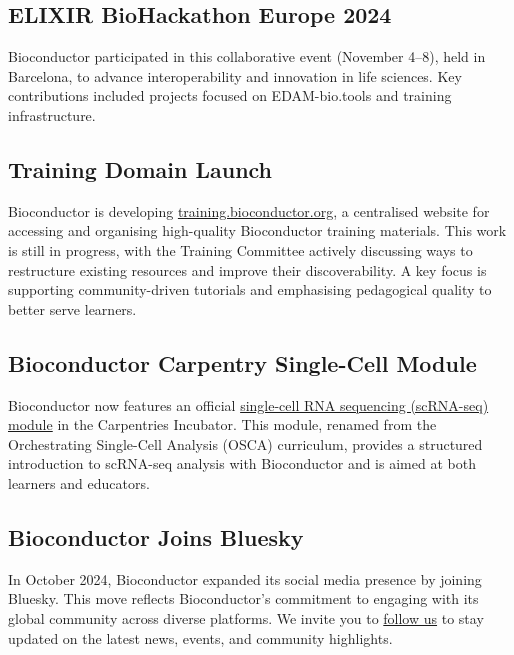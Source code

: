 \hypertarget{elixir-biohackathon-europe-2024}{%
\subsection{ELIXIR BioHackathon Europe 2024}\label{elixir-biohackathon-europe-2024}}

Bioconductor participated in this collaborative event (November 4--8), held in Barcelona, to advance interoperability and innovation in life sciences. Key contributions included projects focused on EDAM-bio.tools and training infrastructure.

\hypertarget{training-domain-launch}{%
\subsection{Training Domain Launch}\label{training-domain-launch}}

Bioconductor is developing \href{https://training.bioconductor.org/}{training.bioconductor.org}, a centralised website for accessing and organising high-quality Bioconductor training materials. This work is still in progress, with the Training Committee actively discussing ways to restructure existing resources and improve their discoverability. A key focus is supporting community-driven tutorials and emphasising pedagogical quality to better serve learners.

\hypertarget{bioconductor-carpentry-single-cell-module}{%
\subsection{Bioconductor Carpentry Single-Cell Module}\label{bioconductor-carpentry-single-cell-module}}

Bioconductor now features an official \href{https://carpentries-incubator.github.io/bioc-scrnaseq/}{single-cell RNA sequencing (scRNA-seq) module} in the Carpentries Incubator. This module, renamed from the Orchestrating Single-Cell Analysis (OSCA) curriculum, provides a structured introduction to scRNA-seq analysis with Bioconductor and is aimed at both learners and educators.

\hypertarget{bioconductor-joins-bluesky}{%
\subsection{Bioconductor Joins Bluesky}\label{bioconductor-joins-bluesky}}

In October 2024, Bioconductor expanded its social media presence by joining Bluesky. This move reflects Bioconductor's commitment to engaging with its global community across diverse platforms. We invite you to \href{https://bsky.app/profile/bioconductor.bsky.social}{follow us} to stay updated on the latest news, events, and community highlights.


